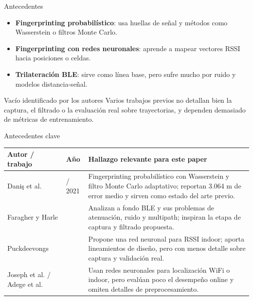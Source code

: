 \documentclass[aspectratio=169]{beamer}
\begin{document}
\begin{frame}{Antecedentes}
  \begin{itemize}
    \item \textbf{Fingerprinting probabil\'istico}: usa huellas de se\~nal y m\'etodos como Wasserstein o filtros Monte Carlo.
    \item \textbf{Fingerprinting con redes neuronales}: aprende a mapear vectores RSSI hacia posiciones o celdas.
    \item \textbf{Trilateraci\'on BLE}: sirve como l\'inea base, pero sufre mucho por ruido y modelos distancia-se\~nal.
  \end{itemize}
  \vspace{0.3cm}
  \begin{block}{Vac\'io identificado por los autores}
    Varios trabajos previos no detallan bien la captura, el filtrado o la evaluaci\'on real sobre trayectorias, y dependen demasiado de m\'etricas de entrenamiento.
  \end{block}
\end{frame}

\begin{frame}{Antecedentes clave}
  \scriptsize
  \begin{tabularx}{\textwidth}{>{\RaggedRight\arraybackslash}p{1.9cm}>{\RaggedRight\arraybackslash}p{1.1cm}>{\RaggedRight\arraybackslash}X}
    \toprule
    \textbf{Autor / trabajo} & \textbf{A\~no} & \textbf{Hallazgo relevante para este paper} \\
    \midrule
    Dani\c{s} et al. & 2017 / 2021 & Fingerprinting probabil\'istico con Wasserstein y filtro Monte Carlo adaptativo; reportan 3.064 m de error medio y sirven como estado del arte previo. \\
    Faragher y Harle & 2015 & Analizan a fondo BLE y sus problemas de atenuaci\'on, ruido y multipath; inspiran la etapa de captura y filtrado propuesta. \\
    Puckdeevongs & 2021 & Propone una red neuronal para RSSI indoor; aporta lineamientos de dise\~no, pero con menos detalle sobre captura y validaci\'on real. \\
    Joseph et al. / Adege et al. & 2018 & Usan redes neuronales para localizaci\'on WiFi o indoor, pero eval\'uan poco el desempe\~no online y omiten detalles de preprocesamiento. \\
    \bottomrule
  \end{tabularx}
\end{frame}
\end{document}
